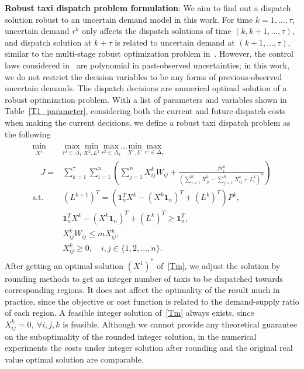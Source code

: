 \documentclass[10pt,twocolumn,twoside,english]{IEEEtran}
\begin{document}
\textbf{Robust taxi dispatch problem formulation}:
We aim to find out a dispatch solution robust to an uncertain demand model in this work. For time $k=1,\dots, \tau$, uncertain demand $r^k$ only affects the dispatch solutions of time $(k, k+1, \dots, \tau)$, and dispatch solution at $k+\tau$ is related to uncertain demand at $(k+1, \dots, \tau)$, similar to the multi-stage robust optimization problem in~\cite{multistage}. However, the control laws considered in~\cite{multistage} are polynomial in past-observed uncertainties; in this work, we do not restrict the decision variables to be any forms of previous-observed uncertain demands. The dispatch decisions are numerical optimal solution of a robust optimization problem. With a list of parameters and variables shown in Table~\ref{T1_parameter}, considering both the current and future dispatch costs when making the current decisions, we define a robust taxi dispatch problem as the following
\begin{align}
\begin{split}
\underset{X^1}{\text{min}}\ &\underset{r^1\in \Delta_1}{\text{max}}\ \underset{X^2, L^2}{\text{min}}\ \underset{r^2\in\Delta_2}{\text{max}}\dots\underset{X^{\tau},L^{\tau}}{\text{min}}\ \underset{r^{\tau}\in\Delta_{\tau}}{\text{max}}\\
 \quad J =& \sum_{k=1}^{\tau} \sum_{i=1}^n\left( \sum\limits_{j=1}^n X^k_{ij} W_{ij}+\frac{\beta r^k_i}{\left (\sum\limits_{j=1}^{n} X^k_{ji}-\sum\limits_{j=1}^{n} X^k_{ij} + L^k_i \right)^{\alpha}}\right) \\
\text{s.t.}\quad
& (L^{k+1})^T=( \mathbf{1}^T_n X^k -(X^k \mathbf{1}_n)^T+(L^k)^T )P^k,\\&\mathbf{1}^T_n X^k -(X^k \mathbf{1}_n)^T+(L^k)^T \geqslant \mathbf{1}_n^T,\\
&  X^k_{ij} W_{ij} \leq m X^k_{ij}, \\&X^k_{ij} \geq 0,\quad i,  j \in \{1, 2, \dots, n \}.
\end{split}
\label{Tm}
\end{align}
After getting an optimal solution $(X^{1})^*$ of~\eqref{Tm}, we adjust the solution by rounding methods to get an integer number of taxis to be dispatched towards corresponding regions. It does not affect the optimality of the result much in practice, since the objective or cost function is related to the demand-supply ratio of each region. A feasible integer solution of~\eqref{Tm} always exists, since $X^k_{ij}=0,\ \forall i,j,k$ is feasible. Although we cannot provide any theoretical guarantee on the suboptimality of the rounded integer solution, in the numerical experiments the costs under integer solution after rounding and the original real value optimal solution are comparable.
\end{document}
